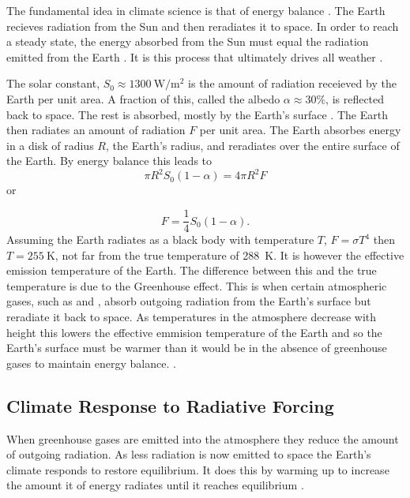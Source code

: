 The fundamental idea in climate science is that of energy balance \parencite{North1981}. The Earth recieves radiation from the Sun and then reradiates it to space.
In order to reach a steady state, the energy absorbed from the Sun must equal the radiation emitted from the Earth \parencite{Peixoto1992}. It is this process
that ultimately drives all weather \parencite{Lucarini?}.

The solar constant, $S_0 \approx \SI{1300}{\watt\per\meter\squared}$ \parencite{} is the amount of radiation receieved by the Earth per unit area.  A fraction of this,
called the albedo $\alpha \approx 30\%$, is reflected back to space. The rest is absorbed, mostly by the Earth's surface \parencite{}. The Earth then radiates an amount of radiation
$F$ per unit area. The Earth absorbes energy in a disk of radius $R$, the Earth's radius, and reradiates over the entire surface of the Earth. By energy balance this leads to
\begin{equation}
  \pi R^2 S_0 (1-\alpha) = 4 \pi R^2 F
\end{equation}
or

\begin{equation}
  \label{eq:energy_balance}
  F = \frac{1}{4} S_0 \left(1 - \alpha\right).
\end{equation}
Assuming the Earth radiates as a black body with temperature $T$, $F = \sigma T^4$ then $T = \SI{255}{\kelvin}$, not far from the true temperature of \SI{288}{\kelvin}.
It is however the effective emission temperature of the Earth.
The difference between this and the true temperature is due to the Greenhouse effect. This is when certain atmospheric gases,
such as  and , absorb outgoing radiation from the Earth's surface
but reradiate it back to space. As temperatures in the atmosphere decrease with height this lowers the effective emmision temperature of the Earth and so the Earth's surface must be
warmer than it would be in the absence of greenhouse gases to maintain energy balance. \parencite{}.

\subsection{Climate Response to Radiative Forcing}
When greenhouse gases are emitted into the atmosphere they reduce the amount of outgoing radiation. As less radiation is now
emitted to space the Earth's climate responds to restore equilibrium. It does this by warming up to increase the amount it of energy
radiates until it reaches equilibrium \parencite{Pierrehumbert2010}. 

